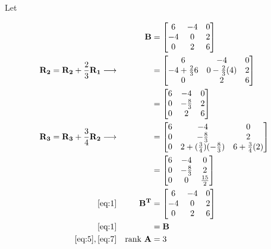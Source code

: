 \documentclass{article}
\begin{document}
Let

\begin{align}
    \label{eq:1}
    && \textbf{B} &= \begin{bmatrix}
    6 & -4 & 0\\
    -4 & 0 & 2\\
    0 & 2 & 6
    \end{bmatrix}
    \\
    \label{eq:2}
    \textbf{R\textsubscript{2}} = \textbf{R\textsubscript{2}} + \frac{2}{3}\textbf{R\textsubscript{1}} \longrightarrow && &= \begin{bmatrix}
    6 & -4 & 0\\
    -4 + \frac{2}{3}{6} & 0 - \frac{2}{3}(4) & 2\\
    0 & 2 & 6
    \end{bmatrix}
    \\
    \label{eq:3}
    && &= \begin{bmatrix}
    6 & -4 & 0\\
    0 & -\frac{8}{3} & 2\\
    0 & 2 & 6
    \end{bmatrix}
    \\
    \label{eq:4}
    \textbf{R\textsubscript{3}} = \textbf{R\textsubscript{3}} + \frac{3}{4}\textbf{R\textsubscript{2}} \longrightarrow && &= \begin{bmatrix}
    6 & -4 & 0\\
    0 & -\frac{8}{3} & 2\\
    0 & 2+(\frac{3}{4})(-\frac{8}{3}) & 6 + \frac{3}{4}(2)
    \end{bmatrix}
    \\
    \label{eq:5}
    && &= \begin{bmatrix}
    6 & -4 & 0\\
    0 & -\frac{8}{3} & 2\\
    0 & 0 & \frac{15}{2}
    \end{bmatrix}
    \\
    \label{eq:6}
    \eqref{eq:1} && \textbf{B\textsuperscript{T}} &= \begin{bmatrix}
    6 & -4 & 0\\
    -4 & 0 & 2\\
    0 & 2 & 6
    \end{bmatrix}
    \\
    \label{eq:7}
    \eqref{eq:1} && &= \textbf{B}
    \\
    \label{eq:8}
    \eqref{eq:5}, \eqref{eq:7} && \text{rank \textbf{A}} &= 3
    \\

\end{align}
\end{document}
